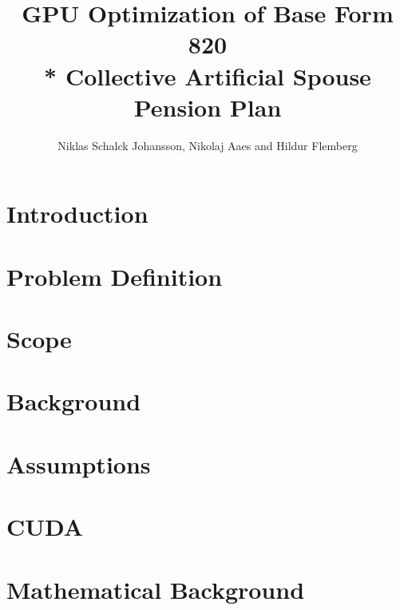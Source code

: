 \documentclass[oribibl]{llncs}
\title{GPU Optimization of Base Form 820 \\* Collective Artificial Spouse Pension Plan}
\author{Niklas Schalck Johansson, Nikolaj Aaes and Hildur Flemberg\\
\email{\{nsjo, niaa, hufl\}@itu.dk}}
\institute{IT University of Copenhagen}
\numberwithin{equation}{section}
\begin{document}
	\maketitle
	\tableofcontents
	\pagebreak
	
	
	\begin{abstract}
		
		\label{abstract}
	\end{abstract}
	
	\section{Introduction}
	
	\label{introduction}
	
	\section{Problem Definition}
	
	\label{problemdefinition}

	\section{Scope}
	
	\label{scope}
		
	\section{Background}
	
	\label{background}
	
	\section{Assumptions}
	
	\label{assumptions}
	
	\section{CUDA}
	
	\label{cuda}
	
	\section{Mathematical Background}
	
	\label{themath}
	
\end{document}
